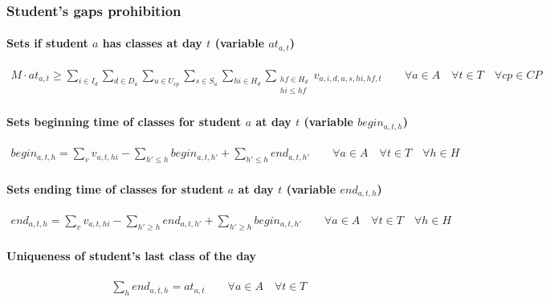 \subsubsection{Student's gaps prohibition}
\label{constrStudentGap}

\paragraph{Sets if student $a$ has classes at day $t$ (variable $at_{a,t}$)}
\begin{eqnarray}
M \cdot at_{a,t} \ge \sum\limits_{i \in I_{d}} \sum\limits_{d \in D_{a}} \sum\limits_{u \in U_{cp}} \sum\limits_{s \in S_{u}} \sum\limits_{hi \in H_{d}} \sum_{\substack {hf \in H_{d} \\ hi\le hf}} v_{a,i,d,u,s,hi,hf,t} \nonumber \qquad 
\forall a \in A \quad
\forall t \in T \quad
\forall cp \in CP
\end{eqnarray}

\paragraph{Sets beginning time of classes for student $a$ at day $t$ (variable $begin_{a,t,h}$)}
\begin{eqnarray}
begin_{a,t,h} = \sum\limits_{v} v_{a,t,hi} - \sum\limits_{h'\le h} begin_{a,t,h'} + \sum\limits_{h'\le h} end_{a,t,h'} \nonumber \qquad
\forall a \in A \quad
\forall t \in T \quad
\forall h \in H
\end{eqnarray}

\paragraph{Sets ending time of classes for student $a$ at day $t$ (variable $end_{a,t,h}$)}
\begin{eqnarray}
end_{a,t,h} = \sum\limits_{v} v_{a,t,hi} - \sum\limits_{h'\ge h} end_{a,t,h'} + \sum\limits_{h'\ge h} begin_{a,t,h'} \nonumber \qquad
\forall a \in A \quad
\forall t \in T \quad
\forall h \in H
\end{eqnarray}

\paragraph{Uniqueness of student's last class of the day}
\begin{eqnarray}
\sum\limits_{h} end_{a,t,h} = at_{a,t} \nonumber \qquad
\forall a \in A \quad
\forall t \in T
\end{eqnarray}

